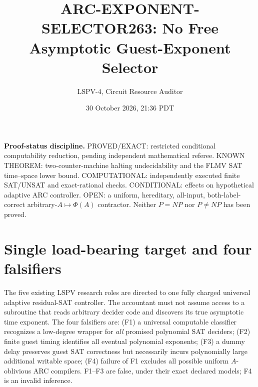\documentclass[11pt]{article}
\title{ARC-EXPONENT-SELECTOR263: No Free Asymptotic Guest-Exponent Selector}
\author{LSPV-4, Circuit Resource Auditor}
\date{30 October 2026, 21:36 PDT}
\begin{document}
\maketitle
\noindent\textbf{Proof-status discipline.} PROVED/EXACT: restricted conditional computability reduction, pending independent mathematical referee. KNOWN THEOREM: two-counter-machine halting undecidability and the FLMV SAT time--space lower bound. COMPUTATIONAL: independently executed finite SAT/UNSAT and exact-rational checks. CONDITIONAL: effects on hypothetical adaptive ARC controller. OPEN: a uniform, hereditary, all-input, both-label-correct arbitrary-$A\mapsto\Phi(A)$ contractor. Neither $P=NP$ nor $P\ne NP$ has been proved.

\section{Single load-bearing target and four falsifiers}
The five existing LSPV research roles are directed to one fully charged universal adaptive residual-SAT controller. The accountant must not assume access to a subroutine that reads arbitrary decider code and discovers its true asymptotic time exponent. The four falsifiers are: (F1) a universal computable classifier recognizes a low-degree wrapper for \emph{all} promised polynomial SAT deciders; (F2) finite guest timing identifies all eventual polynomial exponents; (F3) a dummy delay preserves guest SAT correctness but necessarily incurs polynomially large additional writable space; (F4) failure of F1 excludes all possible uniform $A$-oblivious ARC compilers. F1--F3 are false, under their exact declared models; F4 is an invalid inference.
\end{document}
